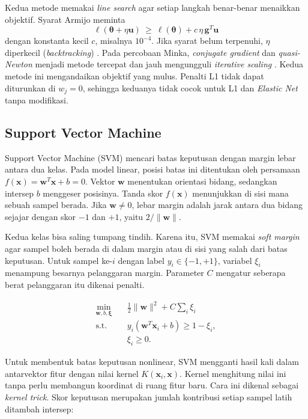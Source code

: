Kedua metode memakai \textit{line search} agar setiap langkah benar-benar menaikkan objektif. Syarat Armijo meminta
\[
\ell(\boldsymbol{\theta}+\eta\mathbf{u})\ \ge\ \ell(\boldsymbol{\theta})+c\,\eta\,\mathbf{g}^{T}\mathbf{u}
\]
dengan konstanta kecil $c$, misalnya $10^{-4}$. Jika syarat belum terpenuhi, $\eta$ diperkecil (\textit{backtracking}) \cite[bab~3]{ref:nocedal-2006}. Pada percobaan Minka, \textit{conjugate gradient} dan \textit{quasi-Newton} menjadi metode tercepat dan jauh mengungguli \textit{iterative scaling} \cite{ref:minka-2003}. Kedua metode ini mengandaikan objektif yang mulus. Penalti L1 tidak dapat diturunkan di $w_j=0$, sehingga keduanya tidak cocok untuk L1 dan \textit{Elastic Net} tanpa modifikasi.

\subsection{Support Vector Machine}
Support Vector Machine (SVM) mencari batas keputusan dengan margin lebar
antara dua kelas. Pada model linear, posisi batas ini ditentukan oleh
persamaan $f(\mathbf{x})=\mathbf{w}^{T}\mathbf{x}+b=0$. Vektor
$\mathbf{w}$ menentukan orientasi bidang, sedangkan intersep $b$ menggeser
posisinya. Tanda skor $f(\mathbf{x})$ menunjukkan di sisi mana sebuah
sampel berada. Jika $\mathbf{w}\ne 0$, lebar margin adalah jarak antara dua
bidang sejajar dengan skor $-1$ dan $+1$, yaitu $2/\lVert\mathbf{w}\rVert$.

Kedua kelas bisa saling tumpang tindih. Karena itu, SVM memakai
\textit{soft margin} agar sampel boleh berada di dalam margin atau di sisi
yang salah dari batas keputusan. Untuk sampel ke-$i$ dengan label
$y_i\in\{-1,+1\}$, variabel $\xi_i$ menampung besarnya pelanggaran margin.
Parameter $C$ mengatur seberapa berat pelanggaran itu dikenai penalti.

\[
\begin{aligned}
\min_{\mathbf{w},b,\boldsymbol{\xi}}\quad
&\frac{1}{2}\lVert\mathbf{w}\rVert^2+C\sum_i\xi_i\\
\text{s.t.}\quad
&y_i(\mathbf{w}^{T}\mathbf{x}_i+b)\geq 1-\xi_i,\\
&\xi_i\geq 0.
\end{aligned}
\]

Untuk membentuk batas keputusan nonlinear, SVM mengganti hasil kali dalam
antarvektor fitur dengan nilai kernel $K(\mathbf{x}_i,\mathbf{x})$.
Kernel menghitung nilai ini tanpa perlu membangun koordinat di ruang fitur
baru. Cara ini dikenal sebagai \textit{kernel trick}. Skor keputusan
merupakan jumlah kontribusi setiap sampel latih ditambah intersep:

